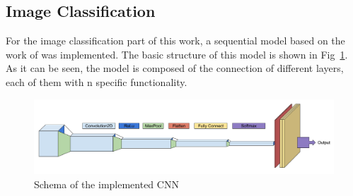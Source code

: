 \subsection{Image Classification}\label{ch:image_classification}
For the image classification part of this work, a sequential model based on the work of \cite{Paisana2017} was implemented. The basic structure of this model is shown in Fig~\ref{fig:cnn}. As it can be seen, the model is composed of the connection of different layers, each of them with n specific functionality.

\begin{figure}[!htb]
    \centering
      \includegraphics[width=\textwidth]{figures/cnn}
      \caption{Schema of the implemented CNN}
      \label{fig:cnn}
\end{figure}

